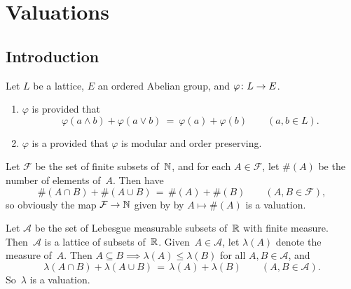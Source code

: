 \documentclass[main.tex]{subfiles}
\begin{document}
\section{Valuations}
\subsection{Introduction}
\noindent
%
%
\begin{dfn}
\label{D:val}
Let $L$ be a lattice, $E$ an ordered Abelian group,
and $\varphi\colon L \rightarrow E$.
\begin{enumerate}
\item
\label{D:val-mod}
$\varphi$ is  provided that
\begin{equation*}
\varphi(a\wedge b) + \varphi(a \vee b)
\ =\ 
\varphi(a) + \varphi(b)
\qquad(a,b\in L).
\end{equation*}

\item
\label{D:val-val}
$\varphi$ is a 
provided that $\varphi$ is modular and order preserving.
\end{enumerate}
\end{dfn}

\begin{ex}
Let $\mathcal{F}$ be the set of finite subsets of~$\mathbb{N}$,
and for each $A\in \mathcal{F}$,
let $\#(A)$ be the number of elements of~$A$.
Then have 
\begin{equation*}
\#(A\cap B) + \#(A\cup B) \,=\, \#(A) + \#(B)
\qquad(A,B\in\mathcal{F}),
\end{equation*}
so obviously the map $\mathcal{F} \rightarrow \mathbb{N}$
given by by $A\mapsto \#(A)$ is a valuation.
\end{ex}

\begin{ex}
\label{E:lmeas-val}
Let $\mathcal{A}$ be the set of Lebesgue measurable
subsets of~$\mathbb{R}$ with finite measure.
Then~$\mathcal{A}$ is a lattice of subsets of~$\mathbb{R}$.
Given~$A\in\mathcal{A}$,
let $\lambda(A)$ denote the measure of~$A$.
Then $A\subseteq B \implies \lambda(A)\leq \lambda (B)$
for all $A,B\in \mathcal{A}$,
and 
\begin{equation*}
\lambda(A\cap B) + \lambda(A\cup B) \,=\, \lambda(A) + \lambda(B)
\qquad(A,B\in\mathcal{A}).
\end{equation*}
So~$\lambda$ is a valuation.
\end{ex}
\end{document}
